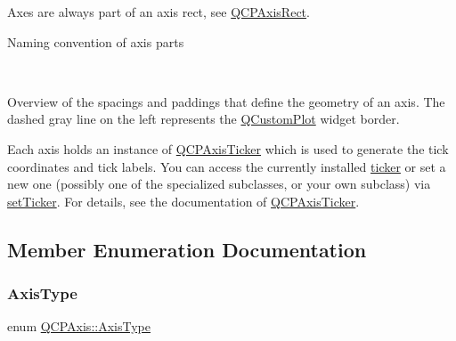 Axes are always part of an axis rect, see \hyperlink{class_q_c_p_axis_rect}{Q\+C\+P\+Axis\+Rect}.  \begin{center}Naming convention of axis parts\end{center}  ~\newline
  \begin{center}Overview of the spacings and paddings that define the geometry of an axis. The dashed gray line on the left represents the \hyperlink{class_q_custom_plot}{Q\+Custom\+Plot} widget border.\end{center} 

Each axis holds an instance of \hyperlink{class_q_c_p_axis_ticker}{Q\+C\+P\+Axis\+Ticker} which is used to generate the tick coordinates and tick labels. You can access the currently installed \hyperlink{class_q_c_p_axis_a7b7a27151be8235059e1294f73ecf615}{ticker} or set a new one (possibly one of the specialized subclasses, or your own subclass) via \hyperlink{class_q_c_p_axis_a4ee03fcd2c74d05cd1a419b9af5cfbdc}{set\+Ticker}. For details, see the documentation of \hyperlink{class_q_c_p_axis_ticker}{Q\+C\+P\+Axis\+Ticker}. 

\subsection{Member Enumeration Documentation}
\mbox{\label{class_q_c_p_axis_ae2bcc1728b382f10f064612b368bc18a}} 
\subsubsection{\texorpdfstring{Axis\+Type}{AxisType}\hspace{0.1cm}{\footnotesize\ttfamily [1/2]}}
{\footnotesize\ttfamily enum \hyperlink{class_q_c_p_axis_ae2bcc1728b382f10f064612b368bc18a}{Q\+C\+P\+Axis\+::\+Axis\+Type}}

